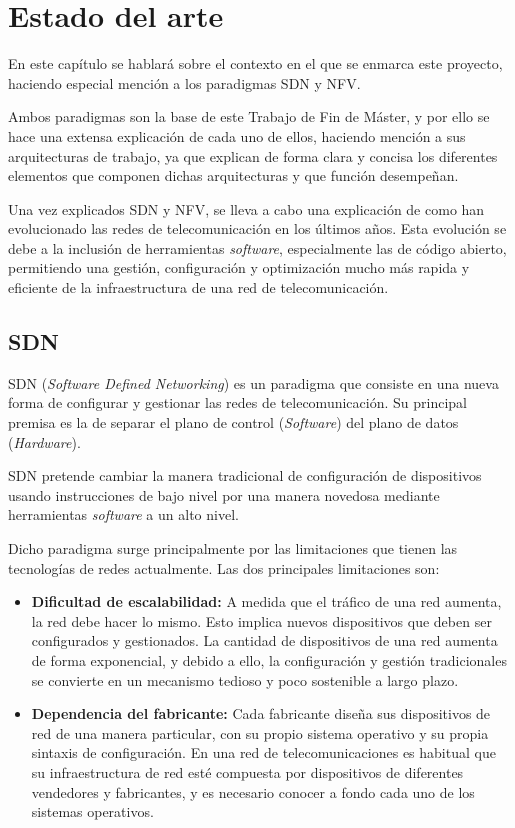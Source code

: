 \chapter{Estado del arte}
En este capítulo se hablará sobre el contexto en el que se enmarca este proyecto, haciendo especial mención a los paradigmas SDN y NFV.

Ambos paradigmas son la base de este Trabajo de Fin de Máster, y por ello se hace una extensa explicación de cada uno de ellos, haciendo mención a sus arquitecturas de trabajo, ya que explican de forma clara y concisa los diferentes elementos que componen dichas arquitecturas y que función desempeñan.

Una vez explicados SDN y NFV, se lleva a cabo una explicación de como han evolucionado las redes de telecomunicación en los últimos años. Esta evolución se debe a la inclusión de herramientas \textit{software}, especialmente las de código abierto, permitiendo una gestión, configuración y optimización mucho más rapida y eficiente de la infraestructura de una red de telecomunicación.

\section{SDN}
\label{sec:sdn}

SDN (\textit{Software Defined Networking})\cite{sdnbib} es un paradigma que consiste en una nueva forma de configurar y gestionar las redes de telecomunicación. Su principal premisa es la de separar el plano de control (\textit{Software}) del plano de datos (\textit{Hardware}).

SDN pretende cambiar la manera tradicional de configuración de dispositivos usando instrucciones de bajo nivel por una manera novedosa mediante herramientas \textit{software} a un alto nivel.

Dicho paradigma surge principalmente por las limitaciones que tienen las tecnologías de redes actualmente. Las dos principales limitaciones son:

\begin{itemize}
	\item \textbf{Dificultad de escalabilidad:} A medida que el tráfico de una red aumenta, la red debe hacer lo mismo. Esto implica nuevos dispositivos que deben ser configurados y gestionados. La cantidad de dispositivos de una red aumenta de forma exponencial, y debido a ello, la configuración y gestión tradicionales se convierte en un mecanismo tedioso y poco sostenible a largo plazo.
	
	\item \textbf{Dependencia del fabricante:} Cada fabricante diseña sus dispositivos de red de una manera particular, con su propio sistema operativo y su propia sintaxis de configuración. En una red de telecomunicaciones es habitual que su infraestructura de red esté compuesta por dispositivos de diferentes vendedores y fabricantes, y es necesario conocer a fondo cada uno de los sistemas operativos.
	
\end{itemize}

